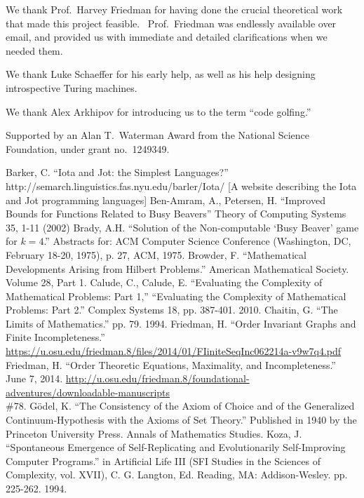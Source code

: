 \documentclass[11pt]{article}
\begin{document}
We thank Prof.\ Harvey Friedman for having done the crucial theoretical work that made this project feasible. \ Prof.\ Friedman was endlessly available over email, and provided us with immediate and detailed clarifications when we needed them.

We thank Luke Schaeffer for his early help, as well as his help designing introspective Turing machines.

We thank Alex Arkhipov for introducing us to the term ``code golfing.''

Supported by an Alan T.\ Waterman Award from the National Science Foundation, under grant no.\ 1249349.

\begin{thebibliography}{100}
 Barker, C. ``Iota and Jot: the Simplest Languages?'' 
http://semarch.linguistics.fas.nyu.edu/barler/Iota/
[A website describing the Iota and Jot programming languages]
 Ben-Amram, A., Petersen, H. ``Improved Bounds for Functions Related to Busy Beavers'' Theory of Computing Systems 35, 1-11 (2002)
 Brady, A.H. ``Solution of the Non-computable `Busy Beaver' game for $k=4$.'' Abstracts for: ACM Computer Science Conference (Washington, DC, February 18-20, 1975), p. 27, ACM, 1975.
 Browder, F. ``Mathematical Developments Arising from Hilbert Problems.'' American Mathematical Society. Volume 28, Part 1.
 Calude, C., Calude, E. ``Evaluating the Complexity of Mathematical Problems: Part 1,'' ``Evaluating the Complexity of Mathematical Problems: Part 2.'' Complex Systems 18, pp. 387-401. 2010.
 Chaitin, G. ``The Limits of Mathematics.'' pp. 79. 1994.
 Friedman, H. ``Order Invariant Graphs and Finite Incompleteness.'' \url{https://u.osu.edu/friedman.8/files/2014/01/FIiniteSeqInc062214a-v9w7q4.pdf}
 Friedman, H. ``Order Theoretic Equations, Maximality, and Incompleteness.'' June 7, 2014. \url{http://u.osu.edu/friedman.8/foundational-adventures/downloadable-manuscripts} \\ 
\#78.
 G\"odel, K. ``The Consistency of the Axiom of Choice and of the Generalized Continuum-Hypothesis with the Axioms of Set Theory.'' Published in 1940 by the Princeton University Press. Annals of Mathematics Studies.
 Koza, J. ``Spontaneous Emergence of Self-Replicating and Evolutionarily Self-Improving Computer Programs.'' in Artificial Life III (SFI Studies in the Sciences of Complexity, vol. XVII), C. G. Langton, Ed. Reading, MA: Addison-Wesley. pp. 225-262. 1994.

\end{thebibliography}
\end{document}
